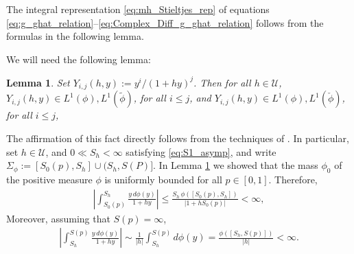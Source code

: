 \documentclass[english,12pt,jmp,graphicx]{revtex4-1}
\newtheorem{lemma}{Lemma}[section]
\begin{document}
The integral representation \eqref{eq:mh_Stieltjes_rep} of equations
\eqref{eq:g_ghat_relation}--\eqref{eq:Complex_Diff_g_ghat_relation}
follows from the formulas in the following lemma.

We will need the following lemma:
\begin{lemma}\label{lem:h_diff_commutation}  
  Set $Y_{i,j}(h,y):=y^i/(1+hy)^j$. Then for all $h\in\mathcal{U}$,
  $Y_{i,j}(h,y)\in L^1(\phi),L^1(\tilde{\phi})$, for all $i\leq j$, and
  $Y_{i,j}(h,y)\in L^1(\phi),L^1(\check{\phi})$, for all $i\leq j$,   
\end{lemma}
%

The affirmation of this fact
directly follows from the techniques of . In particular, set
$h\in\mathcal{U}$, 
and $0\ll S_h<\infty$ satisfying \eqref{eq:S1_asymp}, and write
$\Sigma_\phi:=[S_0(p),S_h]\cup(S_h,S(P)]$. In Lemma 
\ref{lem:h_diff_commutation} we showed that the mass $\phi_0$ of the
positive measure $\phi$ is uniformly bounded for all $p\in[0,1]$. Therefore,
%
\begin{align}\label{eq:L1(y_phi)_bound_finite_set}
 \left| \int_{S_0(p)}^{S_h}\frac{y\,d\phi(y)}{1+hy}\right|\leq
  \frac{S_h\,\phi([S_0(p),S_h])}{|1+hS_0(p)|}<\infty,
\end{align}
%
Moreover, assuming that $S(p)=\infty$,  
%
\begin{align}
 \left|\int_{S_h}^{S(p)}\frac{y\,d\phi(y)}{1+hy}\right|
     \sim\frac{1}{|h|}\int_{S_h}^{S(p)} d\phi(y)
     =\frac{\phi([S_h,S(p)])}{|h|}<\infty.
\end{align}
%
\end{document}
